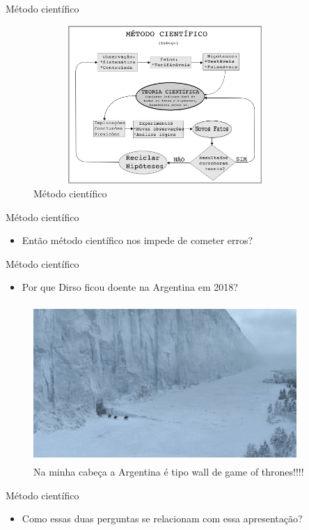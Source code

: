 \begin{frame}	
	\begin{block}{Método científico}	
			\begin{figure}[!htb]
				\centering	  				
					\includegraphics[height=6cm, width = 10cm]{./pic/metodoCientifico.png}
				\caption{Método científico}
				\label{fig_brincadeira}
		\end{figure}	
	\end{block}
\end{frame}

\begin{frame}	
	\begin{block}{Método científico}	
			\begin{itemize}
				\item Então método científico nos impede de cometer erros?
			\end{itemize}
	\end{block}
\end{frame}

\begin{frame}	
	\begin{block}{Método científico}	
			\begin{itemize}
				\item Por que Dirso ficou doente na Argentina em 2018?
			\end{itemize}
			\begin{figure}[!htb]
				\centering	  				
					\includegraphics[height=6cm, width = 10cm]{./pic/wall.jpg}
				\caption{Na minha cabeça a Argentina é tipo wall de game of thrones!!!!}
				\label{fig_brincadeira}
		\end{figure}	
	\end{block}
\end{frame}

\begin{frame}	
	\begin{block}{Método científico}	
			\begin{itemize}
				\item Como essas duas perguntas se relacionam com essa apresentação?
			\end{itemize}
	\end{block}
\end{frame}


			
